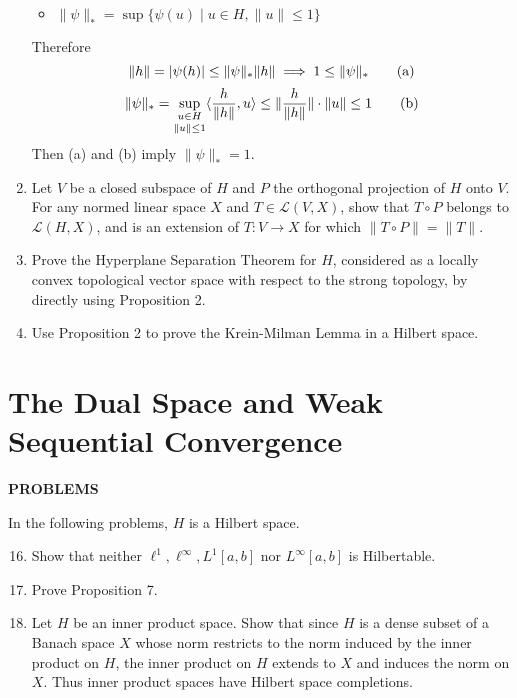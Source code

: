\begin{enumerate}
\begin{itemize}
        \item $\|\psi\|_*=\sup\{\psi(u)\mid u\in H, \|u\|\le1\}$
    \end{itemize}
    Therefore
    \[
        \|h\|=|\psi(h)|\le \|\psi\|_*\|h\|\implies 1\le \|\psi\|_*\tag{\text{a}}
    \]
    \[
        \|\psi\|_*=\underset{\|u\|\le1}{\underset{u\in H}{\sup}}\langle \frac{h}{\|h\|},u\rangle\le \|\frac{h}{\|h\|}\|\cdot\|u\|\le1\tag{\text{b}}
    \]
    Then (a) and (b) imply $\|\psi\|_*=1$.
    \item Let $V$ be a closed subspace of $H$ and $P$ the orthogonal projection of $H$ onto $V$.
    For any normed linear space $X$ and $T\in\mathcal{L}(V,X)$, show that $T\circ P$ belongs to $\mathcal{L}(H,X)$, and is an extension of $T:V\to X$ for which $\|T\circ P\|=\|T\|$.
    \item Prove the Hyperplane Separation Theorem for $H$, considered as a locally convex topological vector space with respect to the strong topology, by directly using Proposition 2.
    \item Use Proposition 2 to prove the Krein-Milman Lemma in a Hilbert space.
\end{enumerate}

\section{The Dual Space and Weak Sequential Convergence}
\begin{center}
	\textbf{PROBLEMS}
\end{center}
In the following problems, $H$ is a Hilbert space.
\begin{enumerate}
	\setcounter{enumi}{15}
    \item Show that neither $\ell^1,\ell^\infty,L^1[a,b]$ nor $L^\infty[a,b]$ is Hilbertable.
    \item Prove Proposition 7.
    \item Let $H$ be an inner product space. Show that since $H$ is a dense subset of a Banach space $X$ whose norm restricts to the norm induced by the inner product on $H$, the inner product on $H$ extends to $X$ and induces the norm on $X$.
    Thus inner product spaces have Hilbert space completions.
\end{enumerate}

